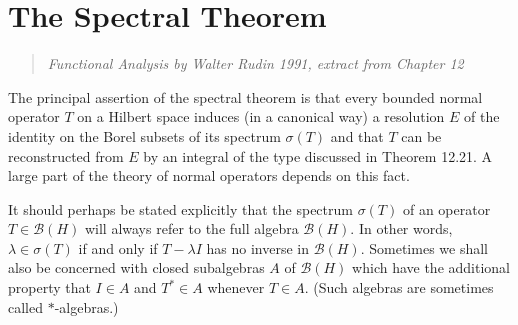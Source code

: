 













\section{The Spectral Theorem}


\begin{quotation}
  \emph{Functional Analysis by Walter Rudin 1991, extract from Chapter 12}
\end{quotation}

The principal assertion of the spectral theorem is that every bounded normal operator $T$ on a Hilbert space induces (in a canonical way) a resolution $E$ of the identity on the Borel subsets of its spectrum $\sigma(T)$ and that $T$ can be reconstructed from $E$ by an integral of the type discussed in Theorem 12.21.
A large part of the theory of normal operators depends on this fact.

It should perhaps be stated explicitly that the spectrum $\sigma(T)$ of an operator $T \in \mathcal{B}(H)$ will always refer to the full algebra $\mathcal{B}(H)$.
In other words, $\lambda \in \sigma(T)$ if and only if $T - \lambda I$ has no inverse in $\mathcal{B}(H)$.
Sometimes we shall also be concerned with closed subalgebras $A$ of $\mathcal{B}(H)$ which have the additional property that $I \in A$ and $T^* \in A$ whenever $T \in A$. (Such algebras are sometimes called $*$-algebras.)

